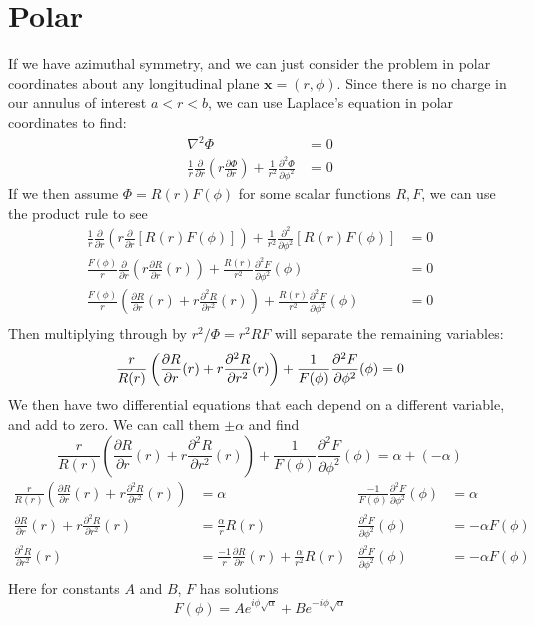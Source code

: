 \documentclass{article}
\begin{document}
\section{Polar}
If we have azimuthal symmetry, and we can just consider the problem in polar coordinates about any longitudinal plane $\mathbf{x} = (r,\phi)$. Since there is no charge in our annulus of interest $a < r < b$, we can use Laplace's equation in polar coordinates to find:
\begin{align*}
\nabla^{2} \Phi &= 0\\
\frac{1}{r} \frac{\partial}{\partial r} \left( r \frac{\partial \Phi}{\partial r} \right) + \frac{1}{r^{2}} \frac{\partial^{2} \Phi}{\partial \phi^{2}} &= 0
\end{align*}
If we then assume $\Phi=R(r)F(\phi)$ for some scalar functions $R,F$, we can use the product rule to see
\begin{align*}
\frac{1}{r} \frac{\partial}{\partial r} \left( r \frac{\partial}{\partial r} \left[ R(r)F(\phi) \right] \right) + \frac{1}{r^{2}} \frac{\partial^{2}}{\partial \phi^{2}} \left[ R(r)F(\phi) \right] &= 0\\
\frac{F(\phi)}{r} \frac{\partial}{\partial r} \left( r \frac{\partial R}{\partial r}(r) \right) + \frac{R(r)}{r^{2}} \frac{\partial^{2} F}{\partial \phi^{2}}(\phi) &= 0\\
\frac{F(\phi)}{r} \left( \frac{\partial R}{\partial r}(r) +  r \frac{\partial^{2} R}{\partial r^{2}}(r) \right) + \frac{R(r)}{r^{2}} \frac{\partial^{2} F}{\partial \phi^{2}}(\phi) &= 0\\
\end{align*}
Then multiplying through by $r^{2}/\Phi = r^{2}RF$ will separate the remaining variables:
\[ \frac{r}{R(r)} \left( \frac{\partial R}{\partial r}(r) +  r \frac{\partial^{2} R}{\partial r^{2}}(r) \right) + \frac{1}{F(\phi)} \frac{\partial^{2} F}{\partial \phi^{2}}(\phi) = 0\\ \]
We then have two differential equations that each depend on a different variable, and add to zero. We can call them $\pm\alpha$ and find
\[ \frac{r}{R(r)} \left( \frac{\partial R}{\partial r}(r) + r \frac{\partial^{2} R}{\partial r^{2}}(r) \right) + \frac{1}{F(\phi)} \frac{\partial^{2} F}{\partial \phi^{2}}(\phi) = \alpha + (-\alpha) \]
\begin{align*}
\frac{r}{R(r)} \left( \frac{\partial R}{\partial r}(r) + r \frac{\partial^{2} R}{\partial r^{2}}(r) \right) &= \alpha
&
\frac{-1}{F(\phi)} \frac{\partial^{2} F}{\partial \phi^{2}}(\phi) &= \alpha\\
\frac{\partial R}{\partial r}(r) + r \frac{\partial^{2} R}{\partial r^{2}}(r) &= \frac{\alpha}{r} R(r)
&
\frac{\partial^{2} F}{\partial \phi^{2}}(\phi) &= -\alpha F(\phi)\\
\frac{\partial^{2} R}{\partial r^{2}}(r) &= \frac{-1}{r} \frac{\partial R}{\partial r}(r) + \frac{\alpha}{r^{2}} R(r)
&
\frac{\partial^{2} F}{\partial \phi^{2}}(\phi) &= -\alpha F(\phi)\\
\end{align*}
Here for constants $A$ and $B$, $F$ has solutions
\[ F(\phi)= Ae^{i\phi\sqrt{\alpha}} + Be^{-i\phi\sqrt{\alpha}} \]
\end{document}
